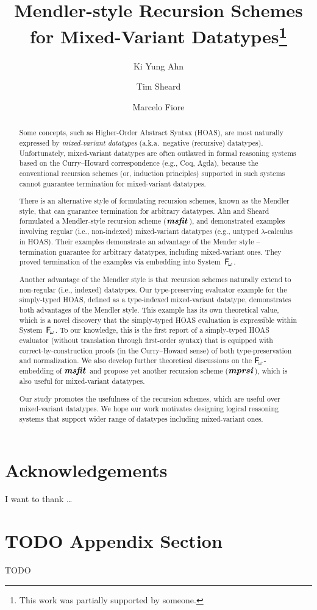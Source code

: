 \documentclass[a4paper,UKenglish]{lipics}
\title{Mendler-style Recursion Schemes for Mixed-Variant Datatypes\footnote{
	This work was partially supported by someone.} }
\author[1]{Ki Yung Ahn}
\author[1]{Tim Sheard}
\author[2]{Marcelo Fiore}
\affil[1]{Department of Computer Science, Portland State University\\
  Oregon, USA\\
  \texttt{\{kya,sheard\}@cs.pdx.edu}}
\affil[2]{Computer Laboratory, University of Cambridge\\
  Cambridge, UK\\
  \texttt{Marcelo.Fiore@cl.cam.ac.uk}}
\newcommand{\eg}[0]{{e.g.}}
\newcommand{\ie}[0]{{i.e.}}
\newcommand{\aka}[0]{{a.k.a.}}
\newcommand{\Fw}[0]{{\ensuremath{\mathsf{\uppercase{F}}_{\!\omega}}}}
\newcommand{\msfit}[1]{\ensuremath{\textbf{\textit{msfit}}_{#1}}}
\newcommand{\mprsi}[1]{\ensuremath{\textbf{\textit{mprsi}}_{#1}}}
\begin{document}
\maketitle

\begin{abstract}
Some concepts, such as Higher-Order Abstract Syntax (HOAS),
are most naturally expressed by \emph{mixed-variant datatypes}
(\aka\ negative (recursive) datatypes). Unfortunately,
mixed-variant datatypes are often outlawed in formal reasoning systems
based on the Curry--Howard correspondence (\eg, Coq, Agda), because
the conventional recursion schemes (or, induction principles) supported in
such systems cannot guarantee termination for mixed-variant datatypes.

There is an alternative style of formulating recursion schemes,
known as the Mendler style, that can guarantee termination for
arbitrary datatypes. Ahn and Sheard \cite{AhnShe11} formulated
a Mendler-style recursion scheme (\msfit{}), and demonstrated
examples involving regular (\ie, non-indexed) mixed-variant datatypes
(\eg, untyped $\lambda$-calculus in HOAS). Their examples demonstrate
an advantage of the Mender style -- termination guarantee for
arbitrary datatypes, including mixed-variant ones. They proved
termination of the examples via embedding into System~\Fw.

Another advantage of the Mendler style is that recursion schemes
naturally extend to non-regular (\ie, indexed) datatypes.
Our type-preserving evaluator example for the simply-typed HOAS, defined as
a type-indexed mixed-variant datatype, demonstrates both advantages of
the Mendler style. This example has its own theoretical value, which is
a novel discovery that the simply-typed HOAS evaluation is expressible
within System~\Fw. To our knowledge, this is the first report of
a simply-typed HOAS evaluator (without translation through first-order syntax)
that is equipped with correct-by-construction proofs
(in the Curry--Howard sense) of both type-preservation and normalization.
We also develop further theoretical discussions on the \Fw-embedding of \msfit{}
and propose yet another recursion scheme (\mprsi{}), which is also useful for
mixed-variant datatypes.

Our study promotes the usefulness of the recursion schemes,
which are useful over mixed-variant datatypes. We hope our
work motivates designing logical reasoning systems that support
wider range of datatypes including mixed-variant ones.
\end{abstract}










\section*{Acknowledgements}
I want to thank \dots

\appendix
\section{TODO Appendix Section}
TODO


\end{document}
